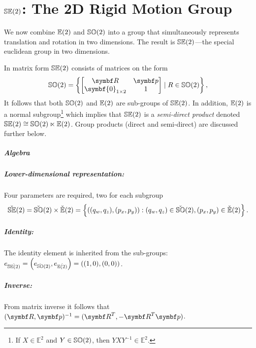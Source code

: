 \chapter{\texorpdfstring{${\mathbb{SE}(2)}$}{SE(2)}: The 2D Rigid Motion Group}

We now combine ${\mathbb{E}(2)}$ and ${\mathbb{SO}(2)}$ into a group that simultaneously represents translation and rotation in two dimensions. The result is ${\mathbb{SE}(2)}$---the special euclidean group in two dimensions.

In matrix form ${\mathbb{SE}(2)}$ consists of matrices on the form
\begin{equation}
  \label{eq:se2_matrix}
  \SOtwo = \left\{ \begin{bmatrix}
    \bR & \bp \\ \symbf{0}_{1 \times 2} & 1
  \end{bmatrix} \mid R \in \SOtwo \right\},
\end{equation}
It follows that both ${\mathbb{SO}(2)}$ and ${\mathbb{E}(2)}$ are sub-groups of ${\mathbb{SE}(2)}$. In addition, ${\mathbb{E}(2)}$ is a normal subgroup\footnote{If $X \in \mathbb{E}^2$ and $Y \in {\mathbb{SO}(2)}$, then $Y X Y^{-1} \in \mathbb{E}^2$.} which implies that ${\mathbb{SE}(2)}$ is a \emph{semi-direct product} denoted ${\mathbb{SE}(2)} \cong {\mathbb{SO}(2)} \ltimes {\mathbb{E}(2)}$. Group products (direct and semi-direct) are discussed further below.

\paragraph{Algebra}

\paragraph{Lower-dimensional representation:} Four parameters are required, two for each subgroup
\begin{equation}
  \check{\mathbb{SE}}(2) = \check{\mathbb{SO}}(2)  \times \check{\mathbb{E}}(2) = \left\{ ((q_w, q_z), (p_x, p_y)) : (q_w, q_z) \in \check{\mathbb{SO}}(2) , (p_x, p_y) \in \check{\mathbb{E}}(2) \right\}.
\end{equation}

\paragraph{Identity:} The identity element is inherited from the sub-groups: $e_{\check{{\mathbb{SE}(2)}}} = \left( e_{\check{\mathbb{SO}}(2)}, e_{\check{{\mathbb{E}(2)}}} \right) = ((1, 0), (0, 0))$.

\paragraph{Inverse:} From matrix inverse it follows that $(\bR, \bp)^{-1} = (\bR^T, -\bR^T \bp)$.


